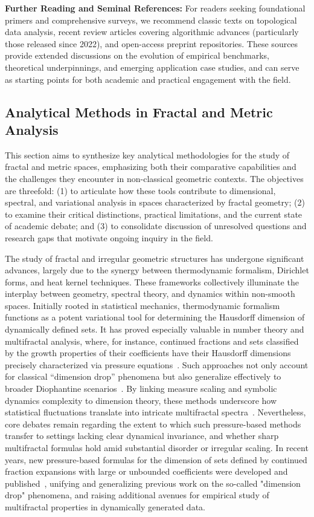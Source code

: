 \documentclass[sigconf]{acmart}
\begin{document}
\noindent\textbf{Further Reading and Seminal References:} For readers seeking foundational primers and comprehensive surveys, we recommend classic texts on topological data analysis, recent review articles covering algorithmic advances (particularly those released since 2022), and open-access preprint repositories. These sources provide extended discussions on the evolution of empirical benchmarks, theoretical underpinnings, and emerging application case studies, and can serve as starting points for both academic and practical engagement with the field.

\subsection{Analytical Methods in Fractal and Metric Analysis}

This section aims to synthesize key analytical methodologies for the study of fractal and metric spaces, emphasizing both their comparative capabilities and the challenges they encounter in non-classical geometric contexts. The objectives are threefold: (1) to articulate how these tools contribute to dimensional, spectral, and variational analysis in spaces characterized by fractal geometry; (2) to examine their critical distinctions, practical limitations, and the current state of academic debate; and (3) to consolidate discussion of unresolved questions and research gaps that motivate ongoing inquiry in the field.

The study of fractal and irregular geometric structures has undergone significant advances, largely due to the synergy between thermodynamic formalism, Dirichlet forms, and heat kernel techniques. These frameworks collectively illuminate the interplay between geometry, spectral theory, and dynamics within non-smooth spaces. Initially rooted in statistical mechanics, thermodynamic formalism functions as a potent variational tool for determining the Hausdorff dimension of dynamically defined sets. It has proved especially valuable in number theory and multifractal analysis, where, for instance, continued fractions and sets classified by the growth properties of their coefficients have their Hausdorff dimensions precisely characterized via pressure equations~\cite{ref38}. Such approaches not only account for classical ``dimension drop'' phenomena but also generalize effectively to broader Diophantine scenarios~\cite{ref13}. By linking measure scaling and symbolic dynamics complexity to dimension theory, these methods underscore how statistical fluctuations translate into intricate multifractal spectra~\cite{ref9}. Nevertheless, core debates remain regarding the extent to which such pressure-based methods transfer to settings lacking clear dynamical invariance, and whether sharp multifractal formulas hold amid substantial disorder or irregular scaling. In recent years, new pressure-based formulas for the dimension of sets defined by continued fraction expansions with large or unbounded coefficients were developed and published~\cite{ref38}, unifying and generalizing previous work on the so-called "dimension drop" phenomena, and raising additional avenues for empirical study of multifractal properties in dynamically generated data.
\end{document}
